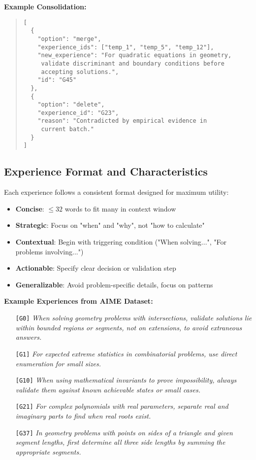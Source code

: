 \documentclass[11pt,a4paper]{article}
\begin{document}
\textbf{Example Consolidation:}
\begin{quote}
\small
\begin{verbatim}
[
  {
    "option": "merge",
    "experience_ids": ["temp_1", "temp_5", "temp_12"],
    "new_experience": "For quadratic equations in geometry,
     validate discriminant and boundary conditions before
     accepting solutions.",
    "id": "G45"
  },
  {
    "option": "delete",
    "experience_id": "G23",
    "reason": "Contradicted by empirical evidence in
     current batch."
  }
]
\end{verbatim}
\end{quote}

\subsection{Experience Format and Characteristics}

Each experience follows a consistent format designed for maximum utility:

\begin{itemize}
    \item \textbf{Concise}: $\leq 32$ words to fit many in context window
    \item \textbf{Strategic}: Focus on "when" and "why", not "how to calculate"
    \item \textbf{Contextual}: Begin with triggering condition ("When solving...", "For problems involving...")
    \item \textbf{Actionable}: Specify clear decision or validation step
    \item \textbf{Generalizable}: Avoid problem-specific details, focus on patterns
\end{itemize}

\textbf{Example Experiences from AIME Dataset:}

\begin{enumerate}
    \item[\texttt{[G0]}] \textit{When solving geometry problems with intersections, validate solutions lie within bounded regions or segments, not on extensions, to avoid extraneous answers.}

    \item[\texttt{[G1]}] \textit{For expected extreme statistics in combinatorial problems, use direct enumeration for small sizes.}

    \item[\texttt{[G10]}] \textit{When using mathematical invariants to prove impossibility, always validate them against known achievable states or small cases.}

    \item[\texttt{[G21]}] \textit{For complex polynomials with real parameters, separate real and imaginary parts to find when real roots exist.}

    \item[\texttt{[G37]}] \textit{In geometry problems with points on sides of a triangle and given segment lengths, first determine all three side lengths by summing the appropriate segments.}
\end{enumerate}
\end{document}
